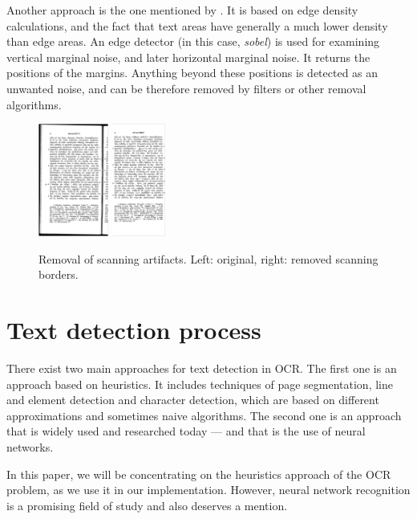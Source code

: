 Another approach is the one mentioned by \citet{marginalNoiseEdge}. It is based on edge density calculations, and the fact that text areas have generally a much lower density than edge areas. An edge detector (in this case, \emph{sobel}) is used for examining vertical marginal noise, and later horizontal marginal noise. It returns the positions of the margins. Anything beyond these positions is detected as an unwanted noise, and can be therefore removed by filters or other removal algorithms.

\begin{figure}
\centering

\includegraphics[height=10em]{img/preprocessing/scan_borders_orig.png}
\qquad
\includegraphics[height=10em]{img/preprocessing/scan_borders_result.png}

\caption{Removal of scanning artifacts. Left: original, right: removed scanning borders.}
\label{fig:scanning}
\end{figure}

\section{Text detection process}


There exist two main approaches for text detection in OCR. The first one is an approach based on heuristics. It includes techniques of page segmentation, line and element detection and character detection, which are based on different approximations and sometimes naive algorithms. The second one is an approach that is widely used and researched today --- and that is the use of neural networks.

In this paper, we will be concentrating on the heuristics approach of the OCR problem, as we use it in our implementation. However, neural network recognition is a promising field of study and also deserves a mention.


